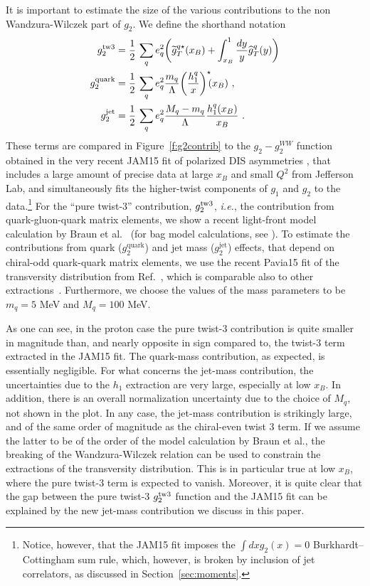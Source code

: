 \documentclass[preprintnumbers,floatfix,nofootinbib]{revtex4}
\def\AAcom#1{{\bf  \textcolor{Red}{[AA: {#1}]}}}
\newcommand{\xbj}{{x_B}}                   %
\newcommand{\mj}{M_q}
\newcommand{\mq}{m_q}
\begin{document}
It is important to estimate the size of the various contributions to the non Wandzura-Wilczek part of $g_2$. We define the shorthand notation
\begin{align}
g_2^{\rm tw3} & = \frac{1}{2}\,\sum_q e_q^2
    \biggl(
    \widetilde g_T^{q \star}(\xbj) 
    + \int_\xbj^1\frac{dy}{y} \widehat{g}_T^q(y) 
    \biggr) 
\nonumber \\ 
g_2^{\text{quark}} &= \frac{1}{2}\,\sum_q e_q^2 
 \frac{\mq}{\Lambda} \bigg( \frac{h_1^q}{x} \bigg)^\star\!\!(\xbj) \ ,
\\
g_2^{\text{jet}} &= \frac{1}{2}\,\sum_q e_q^2 
\frac{\mj-\mq}{\Lambda} \frac{h_1^q(\xbj)}{\xbj} \ .
\nonumber 
\end{align} 
These terms are compared in Figure~\ref{f:g2contrib} to the $g_2-g_2^{WW}$ function obtained in the very recent JAM15 fit of polarized DIS asymmetries
\cite{Sato:2016tuz}, that includes a large amount of precise data at large $\xbj$ and small $Q^2$ from Jefferson Lab, and simultaneously fits the higher-twist components of
$g_1$ and $g_2$ to the data.\footnote{Notice, however, that the JAM15 fit imposes the $\int dx g_2(x) =0$ Burkhardt--Cottingham sum rule, which, however, is broken by inclusion of jet correlators, as discussed in Section~\ref{sec:moments}.} For the ``pure twist-3'' contribution,
$g_2^{\rm tw3}$, {\it i.e.}, the contribution from quark-gluon-quark matrix
elements, we show a recent light-front model calculation by Braun et al.~\cite{Braun:2011aw} (for bag model calculations, see \cite{Jaffe:1990qh,Stratmann:1993aw}). To estimate the contributions
from quark ($g_2^{\text{quark}}$) and jet mass ($g_2^{\text{jet}}$) effects, that depend on chiral-odd quark-quark matrix elements, we use the recent Pavia15 fit of the
transversity distribution from Ref.~\cite{Radici:2015mwa}, which is comparable
also to other 
extractions~\cite{Anselmino:2013vqa,Kang:2015msa}. Furthermore, we choose the
values of the mass parameters to be $\mq=5$ MeV and $\mj = 100$ MeV. 

As one can see, in the proton case the pure twist-3 contribution is quite
smaller in magnitude than, and nearly opposite in sign compared to, the twist-3 term extracted in the JAM15 fit. The quark-mass contribution, as expected, is essentially negligible. 
For what concerns the jet-mass contribution, the uncertainties due to the $h_1$
extraction are very large, especially at low $\xbj$. In addition, there is an
overall normalization uncertainty due to the choice of $\mj$, not shown in the
plot. In any case, the jet-mass contribution is strikingly large, and of the same order of magnitude as the chiral-even twist 3 term. If we assume the latter to be of the order of the model calculation
by Braun et al., the breaking of the Wandzura-Wilczek relation can be used to
constrain the extractions of the transversity distribution. This is in particular true at low $\xbj$, where the pure twist-3 term is expected to vanish. 
Moreover, it is quite clear that the gap
between the pure twist-3 $g_2^{\rm tw3}$ function and the JAM15 fit can be
explained by the new jet-mass contribution we discuss in this paper.  
\end{document}
